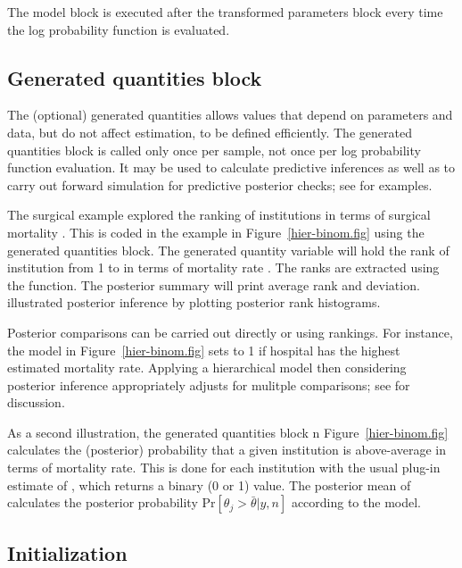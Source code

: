 \documentclass[article]{jss}
\begin{document}
The model block is executed after the transformed parameters block
every time the log probability function is evaluated.  

\subsection{Generated quantities block}

The (optional) generated quantities allows values that depend on
parameters and data, but do not affect estimation, to be defined
efficiently.  The generated quantities block is called only once per
sample, not once per log probability function evaluation.  It may be
used to calculate predictive inferences as well as to carry out
forward simulation for predictive posterior checks; see
\citep{GelmanEtAl:2013} for examples.

The  surgical example explored the ranking of
institutions in terms of surgical mortality \citep[Examples, Volume
1]{LunnEtAl:2000}.  This is coded in the example in
Figure~\ref{hier-binom.fig} using the generated quantities block.  The
generated quantity variable  will hold the rank of
institution  from 1 to  in terms of mortality rate
.  The ranks are extracted using the 
function. The posterior summary will print average rank and deviation.
\citep{LunnEtAl:2000} illustrated posterior inference by plotting
posterior rank histograms.

Posterior comparisons can be carried out directly or using rankings.
For instance, the model in Figure~\ref{hier-binom.fig} sets
 to 1 if hospital  has the highest estimated
mortality rate.  Applying a hierarchical model then considering
posterior inference appropriately adjusts for mulitple comparisons;
see \citep{GelmanEtAl:2012, Efron:2010} for discussion.

As a second illustration, the generated quantities block n
Figure~\ref{hier-binom.fig} calculates the (posterior) probability
that a given institution is above-average in terms of mortality rate.
This is done for each institution  with the usual plug-in
estimate of , which returns a binary (0
or 1) value.  The posterior mean of  calculates
the posterior probability $\mbox{Pr}[\theta_j > \bar{\theta}|y,n]$
according to the model.

\subsection{Initialization}
\end{document}
